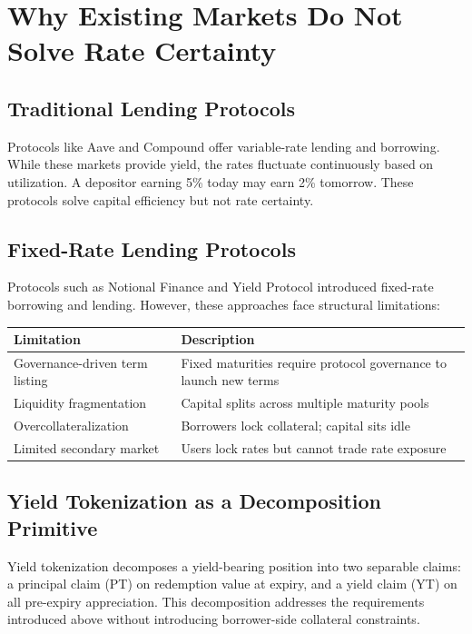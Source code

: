\section{Why Existing Markets Do Not Solve Rate Certainty}

\subsection{Traditional Lending Protocols}

Protocols like Aave and Compound offer variable-rate lending and borrowing. While these markets provide yield, the rates fluctuate continuously based on utilization. A depositor earning 5\% today may earn 2\% tomorrow. These protocols solve capital efficiency but not rate certainty.

\subsection{Fixed-Rate Lending Protocols}

Protocols such as Notional Finance and Yield Protocol introduced fixed-rate borrowing and lending. However, these approaches face structural limitations:

\begin{center}
\begin{tabularx}{\textwidth}{>{\raggedright\arraybackslash}p{4cm} >{\raggedright\arraybackslash}X}
\toprule
\textbf{Limitation} & \textbf{Description} \\
\midrule
Governance-driven term listing & Fixed maturities require protocol governance to launch new terms \\
Liquidity fragmentation & Capital splits across multiple maturity pools \\
Overcollateralization & Borrowers lock collateral; capital sits idle \\
Limited secondary market & Users lock rates but cannot trade rate exposure \\
\bottomrule
\end{tabularx}
\end{center}

\subsection{Yield Tokenization as a Decomposition Primitive}

Yield tokenization decomposes a yield-bearing position into two separable claims: a principal claim (PT) on redemption value at expiry, and a yield claim (YT) on all pre-expiry appreciation. This decomposition addresses the requirements introduced above without introducing borrower-side collateral constraints.

